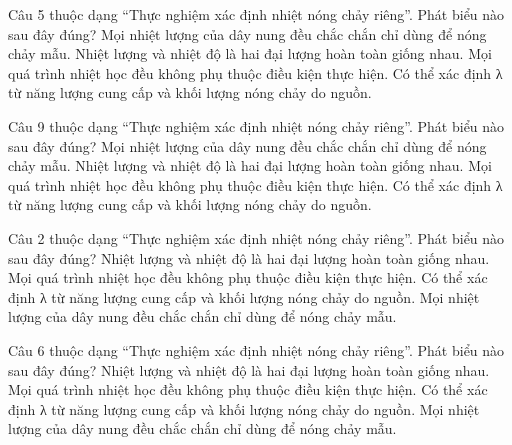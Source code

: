 \begin{ex}
Câu 5 thuộc dạng “Thực nghiệm xác định nhiệt nóng chảy riêng”. Phát biểu nào sau đây đúng?
\choice
{Mọi nhiệt lượng của dây nung đều chắc chắn chỉ dùng để nóng chảy mẫu.}
{Nhiệt lượng và nhiệt độ là hai đại lượng hoàn toàn giống nhau.}
{Mọi quá trình nhiệt học đều không phụ thuộc điều kiện thực hiện.}
{\True Có thể xác định λ từ năng lượng cung cấp và khối lượng nóng chảy do nguồn.}
\end{ex}

\begin{ex}
Câu 9 thuộc dạng “Thực nghiệm xác định nhiệt nóng chảy riêng”. Phát biểu nào sau đây đúng?
\choice
{Mọi nhiệt lượng của dây nung đều chắc chắn chỉ dùng để nóng chảy mẫu.}
{Nhiệt lượng và nhiệt độ là hai đại lượng hoàn toàn giống nhau.}
{Mọi quá trình nhiệt học đều không phụ thuộc điều kiện thực hiện.}
{\True Có thể xác định λ từ năng lượng cung cấp và khối lượng nóng chảy do nguồn.}
\end{ex}

\begin{ex}
Câu 2 thuộc dạng “Thực nghiệm xác định nhiệt nóng chảy riêng”. Phát biểu nào sau đây đúng?
\choice
{Nhiệt lượng và nhiệt độ là hai đại lượng hoàn toàn giống nhau.}
{Mọi quá trình nhiệt học đều không phụ thuộc điều kiện thực hiện.}
{\True Có thể xác định λ từ năng lượng cung cấp và khối lượng nóng chảy do nguồn.}
{Mọi nhiệt lượng của dây nung đều chắc chắn chỉ dùng để nóng chảy mẫu.}
\end{ex}

\begin{ex}
Câu 6 thuộc dạng “Thực nghiệm xác định nhiệt nóng chảy riêng”. Phát biểu nào sau đây đúng?
\choice
{Nhiệt lượng và nhiệt độ là hai đại lượng hoàn toàn giống nhau.}
{Mọi quá trình nhiệt học đều không phụ thuộc điều kiện thực hiện.}
{\True Có thể xác định λ từ năng lượng cung cấp và khối lượng nóng chảy do nguồn.}
{Mọi nhiệt lượng của dây nung đều chắc chắn chỉ dùng để nóng chảy mẫu.}
\end{ex}


